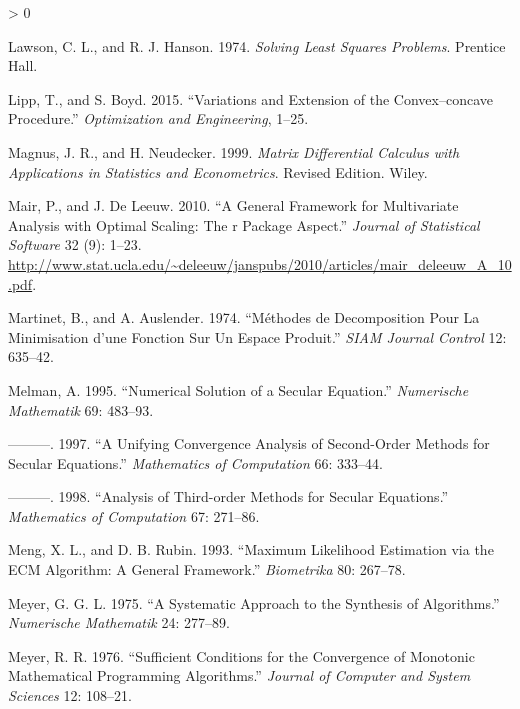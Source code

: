 \documentclass[
  12pt,
]{book}
\newlength{\cslhangindent}
\newenvironment{CSLReferences}[2] %
 {%
  \setlength{\parindent}{0pt}
  \ifodd #1 \everypar{\setlength{\hangindent}{\cslhangindent}}\ignorespaces\fi
  \ifnum #2 > 0
  \setlength{\parskip}{#2\baselineskip}
  \fi
 }%
 {}
\begin{document}
\begin{CSLReferences}{1}{0}
\leavevmode\hypertarget{ref-lawson_hanson_74}{}%
Lawson, C. L., and R. J. Hanson. 1974. \emph{Solving Least Squares Problems}. Prentice Hall.

\leavevmode\hypertarget{ref-lipp_boyd_15}{}%
Lipp, T., and S. Boyd. 2015. {``{Variations and Extension of the Convex--concave Procedure}.''} \emph{Optimization and Engineering}, 1--25.

\leavevmode\hypertarget{ref-magnus_neudecker_99}{}%
Magnus, J. R., and H. Neudecker. 1999. \emph{Matrix Differential Calculus with Applications in Statistics and Econometrics}. Revised Edition. Wiley.

\leavevmode\hypertarget{ref-mair_deleeuw_A_10}{}%
Mair, P., and J. De Leeuw. 2010. {``A General Framework for Multivariate Analysis with Optimal Scaling: The r Package Aspect.''} \emph{Journal of Statistical Software} 32 (9): 1--23. \url{http://www.stat.ucla.edu/~deleeuw/janspubs/2010/articles/mair_deleeuw_A_10.pdf}.

\leavevmode\hypertarget{ref-martinet_auslender_74}{}%
Martinet, B., and A. Auslender. 1974. {``{M}éthodes de Decomposition Pour La Minimisation d'une Fonction Sur Un Espace Produit.''} \emph{{SIAM} Journal Control} 12: 635--42.

\leavevmode\hypertarget{ref-melman_95}{}%
Melman, A. 1995. {``Numerical Solution of a Secular Equation.''} \emph{Numerische Mathematik} 69: 483--93.

\leavevmode\hypertarget{ref-melman_97}{}%
---------. 1997. {``{A Unifying Convergence Analysis of Second-Order Methods for Secular Equations}.''} \emph{Mathematics of Computation} 66: 333--44.

\leavevmode\hypertarget{ref-melman_98}{}%
---------. 1998. {``{Analysis of Third-order Methods for Secular Equations}.''} \emph{Mathematics of Computation} 67: 271--86.

\leavevmode\hypertarget{ref-meng_rubin_93}{}%
Meng, X. L., and D. B. Rubin. 1993. {``Maximum Likelihood Estimation via the ECM Algorithm: A General Framework.''} \emph{Biometrika} 80: 267--78.

\leavevmode\hypertarget{ref-meyer_75}{}%
Meyer, G. G. L. 1975. {``{A Systematic Approach to the Synthesis of Algorithms}.''} \emph{Numerische Mathematik} 24: 277--89.

\leavevmode\hypertarget{ref-meyer_76}{}%
Meyer, R. R. 1976. {``{Sufficient Conditions for the Convergence of Monotonic Mathematical Programming Algorithms}.''} \emph{Journal of Computer and System Sciences} 12: 108--21.


\end{CSLReferences}
\end{document}
